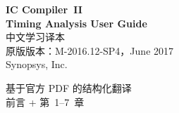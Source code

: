 \documentclass[UTF8,a4paper,openany,oneside]{ctexbook}
\begin{document}
\begin{titlepage}
  \centering
  \vspace*{2cm}
  {\Huge\bfseries IC Compiler\texttrademark\ II}\\[0.6em]
  {\Huge\bfseries Timing Analysis User Guide}\\[1.2em]
  {\LARGE 中文学习译本}\\[2em]
  {\large 原版版本：M-2016.12-SP4，June 2017}\\[0.5em]
  {\large Synopsys, Inc.}\\[3em]
  \begin{minipage}{0.85\textwidth}
    \copyrightnotice
  \end{minipage}
  \vfill
  {\large 基于官方 PDF 的结构化翻译}\\[0.3em]
  {\normalsize 前言 + 第~1--7~章}
\end{titlepage}

\frontmatter
\tableofcontents
\clearpage


\mainmatter







\end{document}
